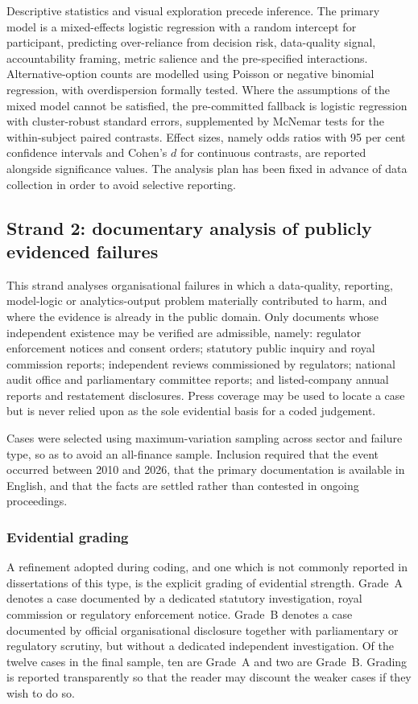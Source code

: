 \documentclass[11pt,a4paper]{article}
\numberwithin{figure}{section}
\numberwithin{table}{section}
\begin{document}
Descriptive statistics and visual exploration precede inference. The primary model is a
mixed-effects logistic regression with a random intercept for participant, predicting over-reliance
from decision risk, data-quality signal, accountability framing, metric salience and the
pre-specified interactions. Alternative-option counts are modelled using Poisson or negative
binomial regression, with overdispersion formally tested. Where the assumptions of the mixed model
cannot be satisfied, the pre-committed fallback is logistic regression with cluster-robust standard
errors, supplemented by McNemar tests for the within-subject paired contrasts. Effect sizes, namely
odds ratios with 95 per cent confidence intervals and Cohen's $d$ for continuous contrasts, are
reported alongside significance values. The analysis plan has been fixed in advance of data
collection in order to avoid selective reporting.

\subsection{Strand 2: documentary analysis of publicly evidenced failures}

This strand analyses organisational failures in which a data-quality, reporting, model-logic or
analytics-output problem materially contributed to harm, and where the evidence is already in the
public domain. Only documents whose independent existence may be verified are admissible, namely:
regulator enforcement notices and consent orders; statutory public inquiry and royal commission
reports; independent reviews commissioned by regulators; national audit office and parliamentary
committee reports; and listed-company annual reports and restatement disclosures. Press coverage
may be used to locate a case but is never relied upon as the sole evidential basis for a coded
judgement.

Cases were selected using maximum-variation sampling across sector and failure type, so as to avoid
an all-finance sample. Inclusion required that the event occurred between 2010 and 2026, that the
primary documentation is available in English, and that the facts are settled rather than contested
in ongoing proceedings.

\subsubsection{Evidential grading}

A refinement adopted during coding, and one which is not commonly reported in dissertations of this
type, is the explicit grading of evidential strength. Grade~A denotes a case documented by a
dedicated statutory investigation, royal commission or regulatory enforcement notice. Grade~B
denotes a case documented by official organisational disclosure together with parliamentary or
regulatory scrutiny, but without a dedicated independent investigation. Of the twelve cases in the
final sample, ten are Grade~A and two are Grade~B. Grading is reported transparently so that the
reader may discount the weaker cases if they wish to do so.
\end{document}
